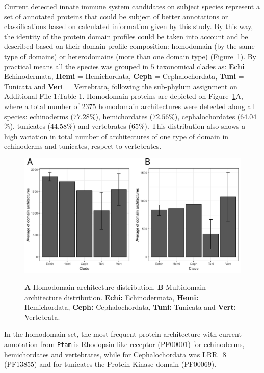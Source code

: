 \documentclass[11pt]{article}
\begin{document}
Current detected innate immune system candidates on subject species represent
a set of annotated proteins that could be subject of better annotations or
classifications based on calculated information given by this study. By this
way, the identity of the protein domain profiles could be taken into account
and be described based on their domain profile composition: homodomain 
(by the same type of domains) or heterodomains (more than one domain type)
(Figure~\ref{fig:domainDistr}). By practical means all the species was grouped 
in $5$ taxonomical clades as: \textbf{Echi} = Echinodermata, \textbf{Hemi} = 
Hemichordata, \textbf{Ceph} = Cephalochordata, \textbf{Tuni} = Tunicata and 
\textbf{Vert} = Vertebrata, following the sub-phylum assignment on Additional 
File 1:Table 1. Homodomain proteins are depicted on Figure~\ref{fig:domainDistr}A, 
where a total number of $2375$ homodomain architectures were detected along all 
species: echinoderms ($77.28$\%), hemichordates ($72.56$\%), cephalochordates 
($64.04$\%), tunicates ($44.58$\%) and vertebrates ($65$\%). This distribution 
also shows a high variation in total number of architectures of one type of domain
in echinoderms and tunicates, respect to vertebrates.

\begin{figure}[ht!]
\centering
\includegraphics[scale=0.53]{figures/completeDistributionDomains} \\
\caption{\textbf{A} Homodomain architecture distribution. 
	\textbf{B} Multidomain architecture distribution. \textbf{Echi:} 
	Echinodermata, \textbf{Hemi:} Hemichordata, \textbf{Ceph:} Cephalochordata, 
	\textbf{Tuni:} Tunicata and \textbf{Vert:} Vertebrata.
}\label{fig:domainDistr}
\end{figure}

In the homodomain set, the most frequent protein architecture with 
current annotation from \texttt{Pfam} is Rhodopsin-like receptor 
(PF00001) for echinoderms, hemichordates and vertebrates, while for 
Cephalochordata was LRR\_8 (PF13855) and for tunicates the Protein 
Kinase domain (PF00069). 
\end{document}
